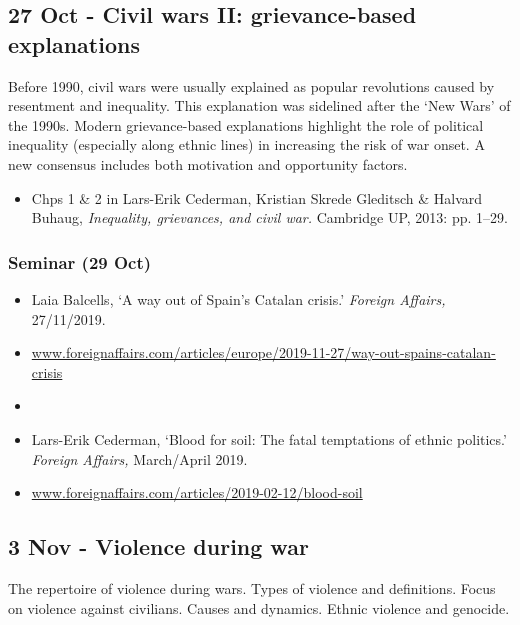 \documentclass[12pt, a4paper]{article}
\begin{document}
\subsection*{27 Oct - Civil wars II: grievance-based explanations}

Before 1990, civil wars were usually explained as popular revolutions caused by resentment and inequality. This explanation was sidelined after the `New Wars' of the 1990s. Modern grievance-based explanations highlight the role of political inequality (especially along ethnic lines) in increasing the risk of war onset. A new consensus includes both motivation and opportunity factors.

\begin{itemize}
\setlength\itemsep{0pt}
\item Chps 1 \& 2 in Lars-Erik Cederman, Kristian Skrede Gleditsch \& Halvard Buhaug, \textit{Inequality, grievances, and civil war.} Cambridge UP, 2013: pp. 1--29.
\end{itemize}

\subsubsection*{Seminar (29 Oct)}

\begin{itemize}
\setlength\itemsep{-5pt}
\item Laia Balcells, `A way out of Spain's Catalan crisis.' \textit{Foreign Affairs,} 27/11/2019.
\item[] \href{https://www.foreignaffairs.com/articles/europe/2019-11-27/way-out-spains-catalan-crisis}{www.foreignaffairs.com/articles/europe/2019-11-27/way-out-spains-catalan-crisis}
\item[]
\item Lars-Erik Cederman, `Blood for soil: The fatal temptations of ethnic politics.' \textit{Foreign Affairs,} March/April 2019.
\item[] \href{https://www.foreignaffairs.com/articles/2019-02-12/blood-soil}{www.foreignaffairs.com/articles/2019-02-12/blood-soil}
\end{itemize}

\subsection*{3 Nov - Violence during war}

The repertoire of violence during wars. Types of violence and definitions. Focus on violence against civilians. Causes and dynamics. Ethnic violence and genocide.
\end{document}
